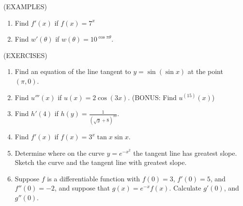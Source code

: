 \documentclass[11pt]{article}
\begin{document}
  \vspace{.1in}

(EXAMPLES)
\begin{enumerate}
\item{Find $f'(x)$ if $f(x) = 7^x$}

  \vspace{1in}

\item{Find $w'(\theta)$ if $w(\theta) = 10^{\cos{\pi \theta}}$.}


    \vspace{2in}
\end{enumerate}

(EXERCISES)
\begin{enumerate}
\item{Find an equation of the line tangent to $y=\sin{(\sin{x})}$ at the point $(\pi,0)$.}

  \vspace{2in}
\item{Find $u'''(x)$ if $u(x) = 2\cos(3x)$. (BONUS:  Find $u^{(15)}(x)$) }
  \vspace{2in}
\item{Find $h'(4)$ if $h(y) = \frac{1}{(\sqrt{y}+8)^{10}}$.}
  \vspace{2in}
\item{Find $f'(x)$ if $f(x) = 3^{x}\tan{x}\sin{x}$.}

  

  \vspace{2.5in}
\item{Determine where on the curve $y=e^{-x^2}$ the tangent line has greatest slope.  Sketch the curve and the tangent line with greatest slope.}

  \vspace{2in}
\item{Suppose $f$ is a differentiable function with $f(0) = 3$, $f'(0)=5$, and $f''(0)=-2$, and suppose that $g(x) = e^{-x}f(x)$.
Calculate $g'(0)$, and $g''(0)$.}

\end{enumerate}
\end{document}
